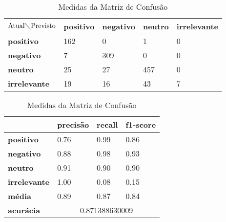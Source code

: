 \begin{table}[h!]
\centering
\begin{minipage}[b]{0.45\linewidth}
\caption{Matriz de Confusão Quaternário: \textit{Random Forest}}
\label{tab:mcb-nb}
\begin{tabular}{|l|l|l|l|l|}
\hline
$\textrm{Atual}\diagdown\textrm{Previsto}$ & \textbf{positivo} & \textbf{negativo} & \textbf{neutro} & \textbf{irrelevante}\\ \hline
\textbf{positivo} & 162 & 0 & 1 & 0\\ \hline
\textbf{negativo} & 7 & 309 & 0 & 0\\ \hline
\textbf{neutro} & 25 & 27 & 457 & 0\\ \hline
\textbf{irrelevante} & 19 & 16 & 43 & 7\\ \hline
\end{tabular}
\end{minipage}
\hspace{0.5cm}
\begin{minipage}[b]{0.45\linewidth}

\centering
\caption{Medidas da Matriz de Confusão}
\label{tab:mmcb-nb}
\begin{tabular}{|l|l|l|l|}
\hline
         & \textbf{precisão} & \textbf{recall} & \textbf{f1-score} \\ \hline
\textbf{positivo} & 0.76     & 0.99   & 0.86     \\ \hline
\textbf{negativo} & 0.88     & 0.98   & 0.93     \\ \hline
\textbf{neutro} & 0.91     & 0.90   & 0.90     \\ \hline
\textbf{irrelevante} & 1.00     & 0.08   & 0.15     \\ \hline
\textbf{média} & 0.89     & 0.87   & 0.84     \\ \hline
\textbf{acurácia} & \multicolumn{3}{|c|}{0.871388630009}\\ \hline
\end{tabular}
\end{minipage}
\end{table}